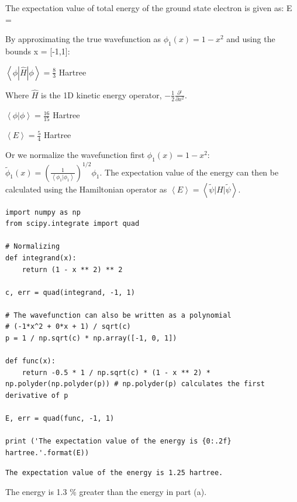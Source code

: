 \documentclass[11pt]{article}
\begin{document}
\begin{center}

The expectation value of total energy of the ground state electron is given as:
\left \langle E \right \rangle = 

By approximating the true wavefunction as $\phi_{1}(x) = 1 - x^{2}$ and using the bounds x = [-1,1]:

${\left \langle \phi | \hat{H} | \phi \right \rangle} = \frac{8}{3}$ Hartree

Where $\hat{H}$ is the 1D kinetic energy operator, $-\frac{1}{2} \frac{\partial^_{2}}{\partial x^{2}}$.

${\left \langle \phi | \phi \right \rangle} = \frac{16}{15}$ Hartree

$\left \langle E \right \rangle = \frac{5}{4} $ Hartree

\end{center}

Or we normalize the wavefunction first \(\phi_{1}(x) = 1 - x^{2}\): \(\tilde{\phi}_{1}(x)= \left(\frac{1}{\left<\phi_1|\phi_1\right>}\right)^{1/2}\phi_1\). The expectation value of the energy can then be calculated using the Hamiltonian operator as \(\left<E\right> = \left<\tilde{\psi}|H|\tilde{\psi}\right>\).

\begin{verbatim}
import numpy as np
from scipy.integrate import quad

# Normalizing
def integrand(x):
    return (1 - x ** 2) ** 2

c, err = quad(integrand, -1, 1)

# The wavefunction can also be written as a polynomial
# (-1*x^2 + 0*x + 1) / sqrt(c)
p = 1 / np.sqrt(c) * np.array([-1, 0, 1])

def func(x):
    return -0.5 * 1 / np.sqrt(c) * (1 - x ** 2) * np.polyder(np.polyder(p)) # np.polyder(p) calculates the first derivative of p

E, err = quad(func, -1, 1)

print ('The expectation value of the energy is {0:.2f} hartree.'.format(E))
\end{verbatim}

\begin{verbatim}
The expectation value of the energy is 1.25 hartree.
\end{verbatim}

The energy is 1.3 \% greater than the energy in part (a).
\end{document}
